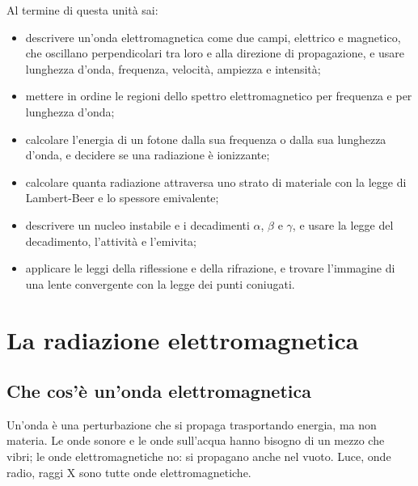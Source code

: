\dispensa

\begin{tcolorbox}[fisbox={formula}{formulaBg},title={Obiettivi dell'unità}]
Al termine di questa unità sai:
\begin{itemize}
  \item descrivere un'onda elettromagnetica come due campi, elettrico e magnetico, che oscillano perpendicolari tra loro e alla direzione di propagazione, e usare lunghezza d'onda, frequenza, velocità, ampiezza e intensità;
  \item mettere in ordine le regioni dello spettro elettromagnetico per frequenza e per lunghezza d'onda;
  \item calcolare l'energia di un fotone dalla sua frequenza o dalla sua lunghezza d'onda, e decidere se una radiazione è ionizzante;
  \item calcolare quanta radiazione attraversa uno strato di materiale con la legge di Lambert-Beer e lo spessore emivalente;
  \item descrivere un nucleo instabile e i decadimenti $\alpha$, $\beta$ e $\gamma$, e usare la legge del decadimento, l'attività e l'emivita;
  \item applicare le leggi della riflessione e della rifrazione, e trovare l'immagine di una lente convergente con la legge dei punti coniugati.
\end{itemize}
\end{tcolorbox}

\section{La radiazione elettromagnetica}
\label{sec:ud7-onde-em}

\subsection{Che cos'è un'onda elettromagnetica}

Un'onda è una perturbazione che si propaga trasportando energia, ma non materia. Le onde sonore e le onde sull'acqua hanno bisogno di un mezzo che vibri; le onde elettromagnetiche no: si propagano anche nel vuoto. Luce, onde radio, raggi X sono tutte onde elettromagnetiche.

